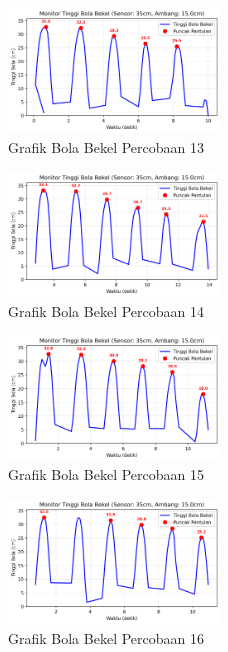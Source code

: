 \begin{figure}[htbp]
    \centering
    \includegraphics[width=0.5\textwidth]{chapters/DataPercobaan/Grafik_Bola_Bekel_13.png}
    \caption{Grafik Bola Bekel Percobaan 13}
\end{figure}
\begin{figure}[htbp]
    \centering
    \includegraphics[width=0.5\textwidth]{chapters/DataPercobaan/Grafik_Bola_Bekel_14.png}
    \caption{Grafik Bola Bekel Percobaan 14}
\end{figure}
\begin{figure}[htbp]
    \centering
    \includegraphics[width=0.5\textwidth]{chapters/DataPercobaan/Grafik_Bola_Bekel_15.png}
    \caption{Grafik Bola Bekel Percobaan 15}
\end{figure}
\begin{figure}[htbp]
    \centering
    \includegraphics[width=0.5\textwidth]{chapters/DataPercobaan/Grafik_Bola_Bekel_16.png}
    \caption{Grafik Bola Bekel Percobaan 16}
\end{figure}
